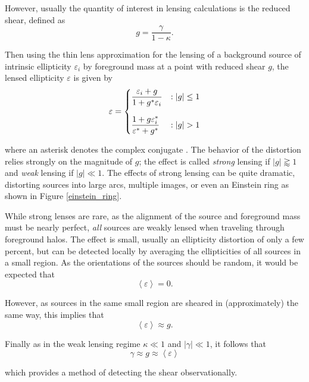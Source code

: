 \documentclass[%
 reprint,
 amsmath,amssymb,
 aps,nofootinbib
]{revtex4-1}
\begin{document}
However, usually the quantity of interest in lensing calculations is the reduced shear, defined as
\begin{equation}\label{reduced_shear}
g=\frac{\gamma}{1-\kappa}.
\end{equation}

\noindent Then using the thin lens approximation for the lensing of a background source of intrinsic ellipticity $\varepsilon_i$ by foreground mass at a point with reduced shear $g$, the lensed ellipticity $\varepsilon$ is given by
\begin{equation}\label{lensing}
 \varepsilon = \begin{dcases}
      \frac{\varepsilon_i+g}{1+g^*\varepsilon_i} & : |g|\leq1 \\[0.75em]
       \frac{1+g\varepsilon_i^*}{\varepsilon^*+g^*} & : |g|>1
   \end{dcases}
\end{equation}

\noindent where an asterisk denotes the complex conjugate \cite{schneider}. The behavior of the distortion relies strongly on the magnitude of $g$; the
effect is called \textit{strong} lensing if $|g|\gtrapprox1$ and \textit{weak} lensing if $|g|\ll1$. The effects of strong lensing can be quite dramatic, distorting sources into large arcs, multiple images, or even an Einstein ring as shown in Figure \ref{einstein_ring}.

While strong lenses are rare, as the alignment of the source and foreground mass must be nearly perfect, \textit{all} sources are weakly lensed when traveling through foreground halos. The effect is small, usually an ellipticity distortion of only a few percent, but can be detected locally by averaging the ellipticities of all sources in a small region. As the orientations of the sources should be random, it would be expected that
$$\left<\varepsilon\right>=0.$$

\noindent However, as sources in the same small region are sheared in (approximately) the same way, this implies that
\begin{equation}
\left<\varepsilon\right>\approx g.
\end{equation}

 \noindent Finally as in the weak lensing regime ${\kappa\ll1}$ and ${|\gamma|\ll1}$, it follows that
 \begin{equation}
 \gamma\approx g\approx\left<\varepsilon\right>
 \end{equation}

 \noindent which provides a method of detecting the shear observationally.
\end{document}
